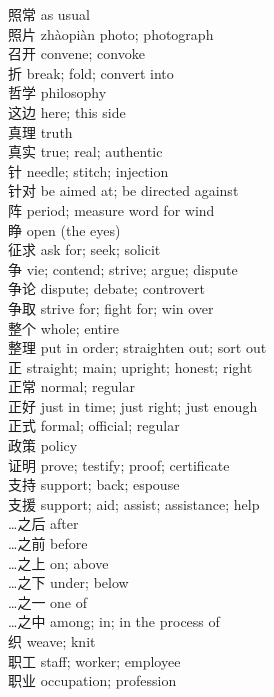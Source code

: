 照常 \quad as usual\\
照片 \quad zhàopiàn \quad photo; photograph\\
召开 \quad convene; convoke\\
折 \quad break; fold; convert into\\
哲学 \quad philosophy\\
这边 \quad here; this side\\
真理 \quad truth\\
真实 \quad true; real; authentic\\
针 \quad needle; stitch; injection\\
针对 \quad be aimed at; be directed against\\
阵 \quad period; measure word for wind\\
睁 \quad open (the eyes)\\
征求 \quad ask for; seek; solicit\\
争 \quad vie; contend; strive; argue; dispute\\
争论 \quad dispute; debate; controvert\\
争取 \quad strive for; fight for; win over\\
整个 \quad whole; entire\\
整理 \quad put in order; straighten out; sort out\\
正 \quad straight; main; upright; honest; right\\
正常 \quad normal; regular\\
正好 \quad just in time; just right; just enough\\
正式 \quad formal; official; regular\\
政策 \quad policy\\
证明 \quad prove; testify; proof; certificate\\
支持 \quad support; back; espouse\\
支援 \quad support; aid; assist; assistance; help\\
…之后 \quad after\\
…之前 \quad before\\
…之上 \quad on; above\\
…之下 \quad under; below\\
…之一 \quad one of\\
…之中 \quad among; in; in the process of\\
织 \quad weave; knit\\
职工 \quad staff; worker; employee\\
职业 \quad occupation; profession\\
